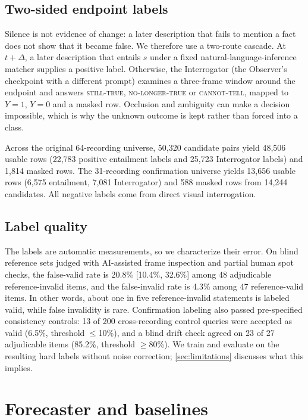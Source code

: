 \documentclass[10pt]{article}
\begin{document}
\subsection{Two-sided endpoint labels}
\label{sec:twosided}
Silence is not evidence of change: a later description that fails to mention a fact does not show that it became false. We therefore use a two-route cascade. At $t+\Delta$, a later description that entails $s$ under a fixed natural-language-inference matcher supplies a positive label. Otherwise, the Interrogator (the Observer's checkpoint with a different prompt) examines a three-frame window around the endpoint and answers \textsc{still-true}, \textsc{no-longer-true} or \textsc{cannot-tell}, mapped to $Y=1$, $Y=0$ and a masked row. Occlusion and ambiguity can make a decision impossible, which is why the unknown outcome is kept rather than forced into a class.

Across the original 64-recording universe, 50,320 candidate pairs yield 48,506 usable rows (22,783 positive entailment labels and 25,723 Interrogator labels) and 1,814 masked rows. The 31-recording confirmation universe yields 13,656 usable rows (6,575 entailment, 7,081 Interrogator) and 588 masked rows from 14,244 candidates. All negative labels come from direct visual interrogation.

\subsection{Label quality}
The labels are automatic measurements, so we characterize their error. On blind reference sets judged with AI-assisted frame inspection and partial human spot checks, the false-valid rate is 20.8\% [10.4\%, 32.6\%] among 48 adjudicable reference-invalid items, and the false-invalid rate is 4.3\% among 47 reference-valid items. In other words, about one in five reference-invalid statements is labeled valid, while false invalidity is rare. Confirmation labeling also passed pre-specified consistency controls: 13 of 200 cross-recording control queries were accepted as valid (6.5\%, threshold $\le$10\%), and a blind drift check agreed on 23 of 27 adjudicable items (85.2\%, threshold $\ge$80\%). We train and evaluate on the resulting hard labels without noise correction; \cref{sec:limitations} discusses what this implies.

\section{Forecaster and baselines}
\label{sec:method}
\end{document}
